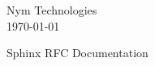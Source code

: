 \documentclass[10pt]{article}
\newcommand{\rfcId}{I-D}
\newcommand{\rfcTitle}{Sphinx RFC Documentation}
\newcommand{\rfcAuthor}{Nym Technologies}
\newcommand{\rfcDate}{\today}
\begin{document}
\begin{multicols}{2}
	\begin{flushleft}
	\end{flushleft}
\columnbreak
	\begin{flushright}
		\rfcAuthor \\
		\rfcDate
	\end{flushright}
\end{multicols}

\vspace{1in} { \center \rfcTitle \\ } \vspace{1in}


\tableofcontents
\pagebreak




\end{document}
